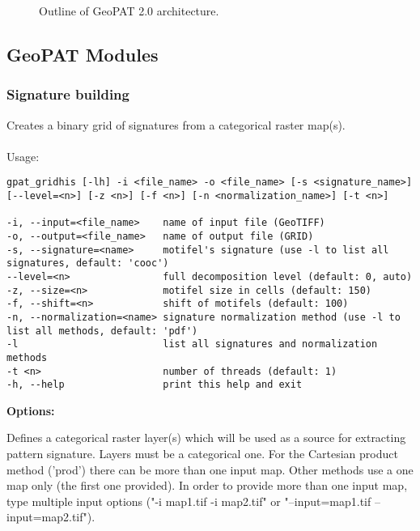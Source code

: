 \begin{figure}[H]
	\caption{Outline of GeoPAT 2.0 architecture.}
	\label{FIG:GPAT} 
\end{figure}

\subsection{GeoPAT Modules}

\subsubsection{Signature building}

Creates a binary grid of signatures from a categorical raster map(s).
\\\\
Usage:

\begin{minipage}{\linewidth}
\begin{lstlisting}
gpat_gridhis [-lh] -i <file_name> -o <file_name> [-s <signature_name>] [--level=<n>] [-z <n>] [-f <n>] [-n <normalization_name>] [-t <n>]

-i, --input=<file_name>    name of input file (GeoTIFF)
-o, --output=<file_name>   name of output file (GRID)
-s, --signature=<name>     motifel's signature (use -l to list all signatures, default: 'cooc')
--level=<n>                full decomposition level (default: 0, auto)
-z, --size=<n>             motifel size in cells (default: 150)
-f, --shift=<n>            shift of motifels (default: 100)
-n, --normalization=<name> signature normalization method (use -l to list all methods, default: 'pdf')
-l                         list all signatures and normalization methods
-t <n>                     number of threads (default: 1)
-h, --help                 print this help and exit
\end{lstlisting}
\end{minipage}

{\bf Options:}


Defines a categorical raster layer(s) which will be used as a source for extracting pattern signature.
Layers must be a categorical one. For the Cartesian product method ('prod') there can be more than one input map.
Other methods use a one map only (the first one provided). 
In order to provide more than one input map, type multiple input options ("-i map1.tif -i map2.tif" or "--input=map1.tif --input=map2.tif").

